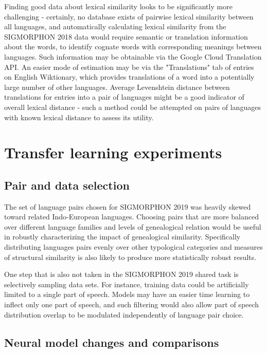 Finding good data about lexical similarity looks to be significantly more challenging - certainly, no database exists of pairwise lexical similarity between all languages, and automatically calculating lexical similarity from the SIGMORPHON 2018 data would require semantic or translation information about the words, to identify cognate words with corresponding meanings between languages. Such information may be obtainable via the Google Cloud Translation API. An easier mode of estimation may be via the "Translations" tab of entries on English Wiktionary, which provides translations of a word into a potentially large number of other languages. Average Levenshtein distance between translations for entries into a pair of languages might be a good indicator of overall lexical distance - such a method could be attempted on pairs of languages with known lexical distance to assess its utility.

\section{Transfer learning experiments}

\subsection{Pair and data selection}

The set of language pairs chosen for SIGMORPHON 2019 was heavily skewed toward related Indo-European languages. Choosing pairs that are more balanced over different language families and levels of genealogical relation would be useful in robustly characterizing the impact of genealogical similarity. Specifically distributing languages pairs evenly over other typological categories and measures of structural similarity is also likely to produce more statistically robust results.

One step that is also not taken in the SIGMORPHON 2019 shared task is selectively sampling data sets. For instance, training data could be artificially limited to a single part of speech. Models may have an easier time learning to inflect only one part of speech, and such filtering would also allow part of speech distribution overlap to be modulated independently of language pair choice. 

\subsection{Neural model changes and comparisons}

